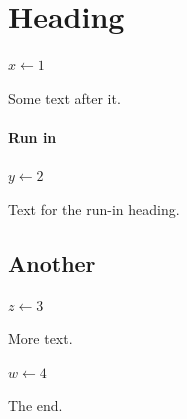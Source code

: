 \documentclass{article}
\begin{document}
\section{Heading}
\begin{algorithm}[b]
\caption{After a heading}
\begin{algorithmic}
\State $x \gets 1$
\end{algorithmic}
\end{algorithm}
Some text after it.
\paragraph{Run in}
\begin{algorithm}[t]
\caption{After a run-in heading}
\begin{algorithmic}
\State $y \gets 2$
\end{algorithmic}
\end{algorithm}
Text for the run-in heading.
\subsection{Another}
\begin{algorithm}[H]
\caption{Here}
\begin{algorithmic}
\State $z \gets 3$
\end{algorithmic}
\end{algorithm}
More text.

\begin{algorithm}[h]
\caption{After text}
\begin{algorithmic}
\State $w \gets 4$
\end{algorithmic}
\end{algorithm}
The end.
\end{document}
